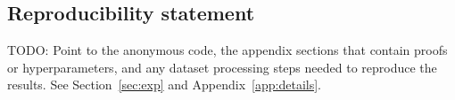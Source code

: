 \subsection*{Reproducibility statement}

TODO: Point to the anonymous code, the appendix sections that contain proofs or
hyperparameters, and any dataset processing steps needed to reproduce the results.
See Section~\ref{sec:exp} and Appendix~\ref{app:details}.
